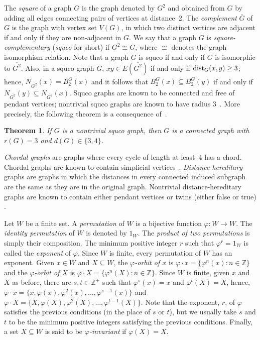 \documentclass[12pt]{article}
\newtheorem{theorem}{Theorem}[section]
\newcommand{\sq}[1]{\overline{#1^2}}
\newcommand{\dist}{\textup{dist}}
\begin{document}
The \emph{square} of a graph $G$ is the graph denoted by $G^2$ and obtained from $G$ by adding all edges connecting pairs of vertices at distance~$2$.  
The \emph{complement} $\overline{G}$ of $G$ is the graph with vertex set $V(G)$, in which two distinct vertices are adjacent if and only if they are non-adjacent in $G$.  
We say that a graph $G$ is \emph{square-complementary} (\emph{squco} for short) if $G^2\cong \overline{G}$, where $\cong$ denotes the graph isomorphism relation.  
Note that a graph $G$ is squco if and only if $G$ is isomorphic to $\sq{G}$. 
Also, in a squco graph $G$, $xy\in E(\sq{G})$ if and only if $\dist_{G}(x,y)\geq 3$; hence, $N_{\sq{G}}(x) = \overline{B_{2}^{G}(x)}$ and it follows that $B_{2}^{G}(x)\subseteq B_{2}^{G}(y)$ if and only if $N_{\sq{G}}(y)\subseteq N_{\sq{G}}(x)$.  
Squco graphs are known to be connected and free of pendant vertices; nontrivial squco graphs are known to have radius 3~\cite{BST94}. 
More precisely, the following theorem is a consequence of~\cite[Lemmas 1.1 and 1.2]{BST94}.

\begin{theorem}\label{thm:squco-radius-diameter}
  If $G$ is a nontrivial squco graph, then $G$ is a connected graph with $r(G) = 3$ and $d(G)\in \{3,4\}$.
\end{theorem}

\emph{Chordal graphs} are graphs where every cycle of length at least~$4$ has a chord.  
Chordal graphs are known to contain simplicial vertices~\cite{Dir61}.  
\emph{Distance-hereditary} graphs are graphs in which the distances in every connected induced subgraph are the same as they are in the original graph. 
Nontrivial distance-hereditary graphs are known to contain either pendant vertices or twins (either false or true) \cite{BM86}.

Let $W$ be a finite set. 
A \emph{permutation} of $W$ is a bijective function $\varphi:W\rightarrow W$. 
The \emph{identity permutation} of $W$ is denoted by $1_{W}$. 
The \emph{product of two permutations} is simply their composition. 
The minimum positive integer $r$ such that $\varphi^{r} =1_{W}$ is called the \emph{exponent} of $\varphi$. 
Since $W$ is finite, every permutation of $W$ has an exponent. 
Given $x\in W$ and $X\subseteq W$, the \emph{$\varphi$-orbit of $x$} is ${\varphi\cdot x =\{\varphi^{n}(x)\colon n\in \mathbb{Z}\}}$ and the \emph{$\varphi$-orbit of $X$} is ${\varphi\cdot X =\{\varphi^{n}(X)\colon n\in \mathbb{Z}\}}$.
Since $W$ is finite, given $x$ and $X$ as before, there are $s,t\in \mathbb{Z}^{+}$ such that $\varphi^{s}(x)=x$ and $\varphi^{t}(X)=X$, hence, $\varphi\cdot x =\{x, \varphi(x), \varphi^{2}(x), \ldots,\varphi^{s-1}(x)\}$ and $\varphi\cdot X =\{X, \varphi(X), \varphi^{2}(X), \ldots,\varphi^{t-1}(X)\}$. 
Note that the exponent, $r$, of $\varphi$ satisfies the previous conditions (in the place of $s$ or $t$), but we usually take $s$ and $t$ to be the minimum positive integers satisfying the previous conditions. 
Finally, a set $X\subseteq W$ is said to be \emph{$\varphi$-invariant} if $\varphi(X) =X$.
\end{document}
